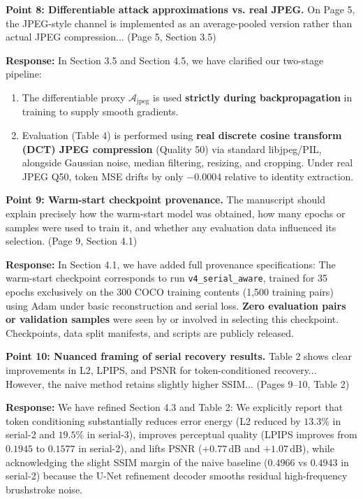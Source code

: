 \documentclass[11pt,a4paper]{article}
\begin{document}
\begin{revcomment}
\textbf{Point 8: Differentiable attack approximations vs. real JPEG.} On Page 5, the JPEG-style channel is implemented as an average-pooled version rather than actual JPEG compression... (Page 5, Section 3.5)
\end{revcomment}

\noindent \textbf{Response:} In Section 3.5 and Section 4.5, we have clarified our two-stage pipeline:
\begin{enumerate}[leftmargin=*]
\item The differentiable proxy $\mathcal{A}_{\text{jpeg}}$ is used \textbf{strictly during backpropagation} in training to supply smooth gradients.
\item Evaluation (Table 4) is performed using \textbf{real discrete cosine transform (DCT) JPEG compression} (Quality 50) via standard libjpeg/PIL, alongside Gaussian noise, median filtering, resizing, and cropping. Under real JPEG Q50, token MSE drifts by only $-0.0004$ relative to identity extraction.
\end{enumerate}

\begin{revcomment}
\textbf{Point 9: Warm-start checkpoint provenance.} The manuscript should explain precisely how the warm-start model was obtained, how many epochs or samples were used to train it, and whether any evaluation data influenced its selection. (Page 9, Section 4.1)
\end{revcomment}

\noindent \textbf{Response:} In Section 4.1, we have added full provenance specifications: The warm-start checkpoint corresponds to run \texttt{v4\_serial\_aware}, trained for 35 epochs exclusively on the 300 COCO training contents (1,500 training pairs) using Adam under basic reconstruction and serial loss. \textbf{Zero evaluation pairs or validation samples} were seen by or involved in selecting this checkpoint. Checkpoints, data split manifests, and scripts are publicly released.

\begin{revcomment}
\textbf{Point 10: Nuanced framing of serial recovery results.} Table 2 shows clear improvements in L2, LPIPS, and PSNR for token-conditioned recovery... However, the naive method retains slightly higher SSIM... (Pages 9--10, Table 2)
\end{revcomment}

\noindent \textbf{Response:} We have refined Section 4.3 and Table 2: We explicitly report that token conditioning substantially reduces error energy (L2 reduced by $13.3\%$ in serial-2 and $19.5\%$ in serial-3), improves perceptual quality (LPIPS improves from $0.1945$ to $0.1577$ in serial-2), and lifts PSNR ($+0.77$\,dB and $+1.07$\,dB), while acknowledging the slight SSIM margin of the naive baseline ($0.4966$ vs $0.4943$ in serial-2) because the U-Net refinement decoder smooths residual high-frequency brushstroke noise.
\end{document}
